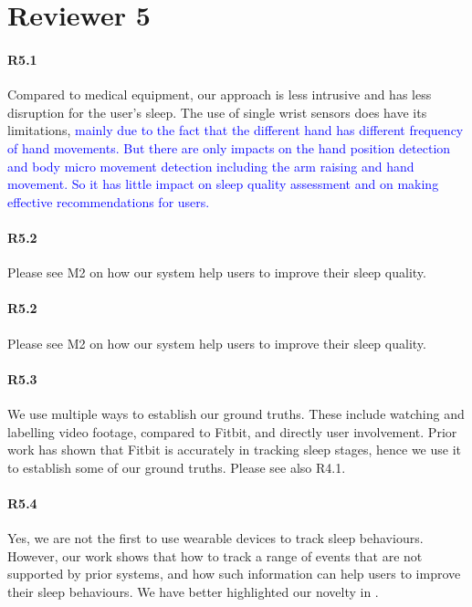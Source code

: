 \section*{Reviewer 5}

\paragraph{R5.1} Compared to medical equipment, our approach is less intrusive and has less disruption for the user's sleep. The use of single wrist sensors does have its limitations, \textcolor{blue}{mainly due to the fact that the different hand has different frequency of hand movements. But there are only impacts on  the hand position detection and body micro movement detection including the arm raising and hand movement. So it has little impact on sleep quality assessment and on making effective recommendations for users.}

\paragraph{R5.2} Please see M2 on how our system help users to improve their sleep quality.

\paragraph{R5.2} Please see M2 on how our system help users to improve their sleep quality.

\paragraph{R5.3} We use multiple ways to establish our ground truths. These include watching and labelling video footage, compared to
Fitbit, and directly user involvement. Prior work has shown that Fitbit is accurately in tracking sleep stages, hence we use it to
establish some of our ground truths. Please see also R4.1.

\paragraph{R5.4} Yes, we are not the first to use wearable devices to track sleep behaviours. However, our work shows that how
 to track a range of events that are not supported by prior systems, and how such information can help users to improve
their sleep behaviours. We have better highlighted our novelty in .
